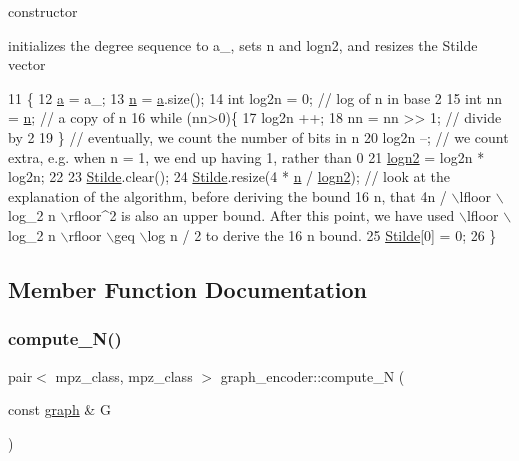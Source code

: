 constructor 

initializes the degree sequence to a\+\_\+, sets n and logn2, and resizes the Stilde vector 
\begin{DoxyCode}
11                                                  \{
12   \hyperlink{classgraph__encoder_a56eb5cf480ae5c2fca9f3a45f2ffd4f1}{a} = a\_;
13   \hyperlink{classgraph__encoder_a7fedc9ace19e34abb32f1851c8597591}{n} = \hyperlink{classgraph__encoder_a56eb5cf480ae5c2fca9f3a45f2ffd4f1}{a}.size();
14   \textcolor{keywordtype}{int} log2n = 0; \textcolor{comment}{// log of n in base 2}
15   \textcolor{keywordtype}{int} nn = \hyperlink{classgraph__encoder_a7fedc9ace19e34abb32f1851c8597591}{n}; \textcolor{comment}{// a copy of n}
16   \textcolor{keywordflow}{while} (nn>0)\{
17     log2n ++;
18     nn = nn >> 1; \textcolor{comment}{// divide by 2}
19   \} \textcolor{comment}{// eventually, we count the number of bits in n}
20   log2n --; \textcolor{comment}{// we count extra, e.g. when n = 1, we end up having 1, rather than 0}
21   \hyperlink{classgraph__encoder_a27fde3a95a280304877b1e37fc4d8553}{logn2} = log2n * log2n;
22 
23   \hyperlink{classgraph__encoder_a342688a3fdee511b7fae3f155cfb10cf}{Stilde}.clear();
24   \hyperlink{classgraph__encoder_a342688a3fdee511b7fae3f155cfb10cf}{Stilde}.resize(4 * \hyperlink{classgraph__encoder_a7fedc9ace19e34abb32f1851c8597591}{n} / \hyperlink{classgraph__encoder_a27fde3a95a280304877b1e37fc4d8553}{logn2}); \textcolor{comment}{// look at the explanation of the algorithm, before deriving
       the bound 16 n, that 4n / \(\backslash\)lfloor \(\backslash\)log\_2 n \(\backslash\)rfloor^2 is also an upper bound. After this point, we have used
       \(\backslash\)lfloor \(\backslash\)log\_2 n \(\backslash\)rfloor \(\backslash\)geq \(\backslash\)log n / 2 to derive the 16 n bound.}
25   \hyperlink{classgraph__encoder_a342688a3fdee511b7fae3f155cfb10cf}{Stilde}[0] = 0;
26 \}
\end{DoxyCode}


\subsection{Member Function Documentation}
\mbox{\label{classgraph__encoder_ad565513b399e97925babdb32d1c914f3}} 
\subsubsection{\texorpdfstring{compute\+\_\+\+N()}{compute\_N()}}
{\footnotesize\ttfamily pair$<$ mpz\+\_\+class, mpz\+\_\+class $>$ graph\+\_\+encoder\+::compute\+\_\+N (\begin{DoxyParamCaption}\item[{const \hyperlink{classgraph}{graph} \&}]{G }\end{DoxyParamCaption})}



